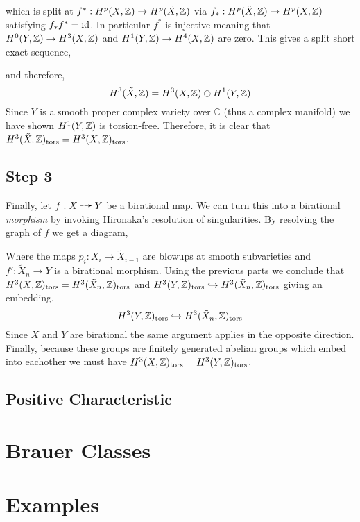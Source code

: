 \documentclass[12pt]{article}
\newcommand{\tors}{\mathrm{tors}}
\renewcommand{\C}{\mathbb{C}}
\begin{document}
which is split at $f^* : H^p(X, \mathbb{Z}) \to H^p(\tilde{X}, \mathbb{Z})$ via $f_* : H^p(\tilde{X}, \mathbb{Z}) \to H^p(X, \mathbb{Z})$ satisfying $f_* f^* = \mathrm{id}$. In particular $f^*$ is injective meaning that $H^0(Y, \mathbb{Z}) \to H^3(X, \mathbb{Z})$ and $H^1(Y, \mathbb{Z}) \to H^4(X, \mathbb{Z})$ are zero. This gives a split short exact sequence,
\begin{center}
\end{center}
and therefore,
\[ H^3(\tilde{X}, \mathbb{Z}) = H^3(X, \mathbb{Z}) \oplus H^1(Y, \mathbb{Z}) \]
Since $Y$ is a smooth proper complex variety over $\C$ (thus a complex manifold) we have shown $H^1(Y, \mathbb{Z})$ is torsion-free. Therefore, it is clear that $H^3(\tilde{X}, \Z)_{\tors} = H^3(X, \Z)_{\tors}$.

\subsection{Step 3}

Finally, let $f : X \rat Y$ be a birational map. We can turn this into a birational \textit{morphism} by invoking Hironaka's resolution of singularities. By resolving the graph of $f$ we get a diagram,
\begin{center}
\end{center}
Where the maps $p_i : \tilde{X}_i \to \tilde{X}_{i-1}$ are blowups at smooth subvarieties and $f' : \tilde{X}_n \to Y$ is a birational morphism. Using the previous parts we conclude that $H^3(X, \Z)_{\tors} = H^3(\tilde{X}_n, \Z)_{\tors}$ and $H^3(Y, \Z)_{\tors} \embed H^3(\tilde{X}_n, \Z)_{\tors}$ giving an embedding,
\[ H^3(Y, \Z)_{\tors} \embed H^3(\tilde{X}_n, \Z)_{\tors} \]
Since $X$ and $Y$ are birational the same argument applies in the opposite direction. Finally, because these groups are finitely generated abelian groups which embed into eachother we must have $H^3(X, \Z)_{\tors} = H^3(Y, \Z)_{\tors}$.

\subsection{Positive Characteristic}

\section{Brauer Classes}

\section{Examples}
\end{document}
